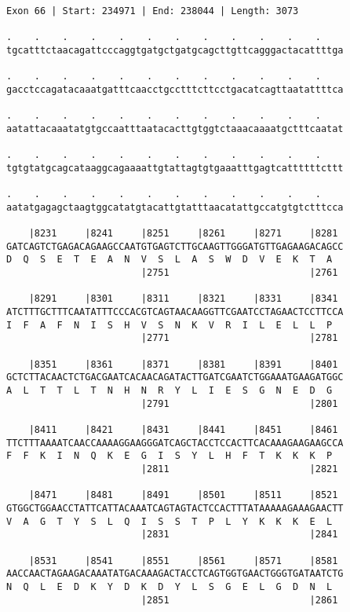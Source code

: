 \documentclass{article}
\begin{document}
\newpage
\begin{Verbatim}
Exon 66 | Start: 234971 | End: 238044 | Length: 3073
 
.    .    .    .    .    .    .    .    .    .    .    .    
tgcatttctaacagattcccaggtgatgctgatgcagcttgttcagggactacattttga
  
.    .    .    .    .    .    .    .    .    .    .    .    
gacctccagatacaaatgatttcaacctgcctttcttcctgacatcagttaatattttca
  
.    .    .    .    .    .    .    .    .    .    .    .    
aatattacaaatatgtgccaatttaatacacttgtggtctaaacaaaatgctttcaatat
  
.    .    .    .    .    .    .    .    .    .    .    .    
tgtgtatgcagcataaggcagaaaattgtattagtgtgaaatttgagtcattttttcttt
  
.    .    .    .    .    .    .    .    .    .    .    .    
aatatgagagctaagtggcatatgtacattgtatttaacatattgccatgtgtctttcca
  
    |8231     |8241     |8251     |8261     |8271     |8281 
GATCAGTCTGAGACAGAAGCCAATGTGAGTCTTGCAAGTTGGGATGTTGAGAAGACAGCC
D  Q  S  E  T  E  A  N  V  S  L  A  S  W  D  V  E  K  T  A  
                        |2751                         |2761 
  
    |8291     |8301     |8311     |8321     |8331     |8341 
ATCTTTGCTTTCAATATTTCCCACGTCAGTAACAAGGTTCGAATCCTAGAACTCCTTCCA
I  F  A  F  N  I  S  H  V  S  N  K  V  R  I  L  E  L  L  P  
                        |2771                         |2781 
  
    |8351     |8361     |8371     |8381     |8391     |8401 
GCTCTTACAACTCTGACGAATCACAACAGATACTTGATCGAATCTGGAAATGAAGATGGC
A  L  T  T  L  T  N  H  N  R  Y  L  I  E  S  G  N  E  D  G  
                        |2791                         |2801 
  
    |8411     |8421     |8431     |8441     |8451     |8461 
TTCTTTAAAATCAACCAAAAGGAAGGGATCAGCTACCTCCACTTCACAAAGAAGAAGCCA
F  F  K  I  N  Q  K  E  G  I  S  Y  L  H  F  T  K  K  K  P  
                        |2811                         |2821 
  
    |8471     |8481     |8491     |8501     |8511     |8521 
GTGGCTGGAACCTATTCATTACAAATCAGTAGTACTCCACTTTATAAAAAGAAAGAACTT
V  A  G  T  Y  S  L  Q  I  S  S  T  P  L  Y  K  K  K  E  L  
                        |2831                         |2841 
  
    |8531     |8541     |8551     |8561     |8571     |8581 
AACCAACTAGAAGACAAATATGACAAAGACTACCTCAGTGGTGAACTGGGTGATAATCTG
N  Q  L  E  D  K  Y  D  K  D  Y  L  S  G  E  L  G  D  N  L  
                        |2851                         |2861 
  

\end{Verbatim}
\end{document}
